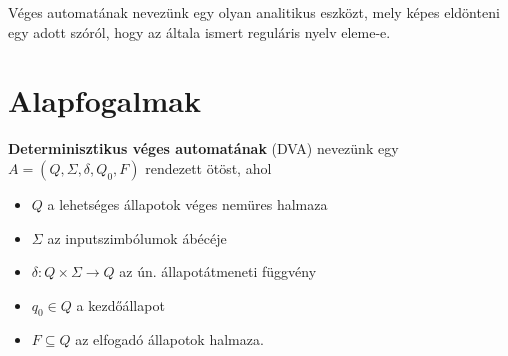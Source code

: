 Véges automatának nevezünk egy olyan analitikus eszközt, mely képes eldönteni egy adott szóról, hogy az általa ismert reguláris nyelv eleme-e.

\section{Alapfogalmak}
\begin{definition*}
	\textbf{Determinisztikus véges automatának} (DVA) nevezünk egy $ A = \left( Q, \Sigma, \delta, Q_0, F \right) $ rendezett ötöst, ahol
	\begin{itemize}
		\item $ Q $ a lehetséges állapotok véges nemüres halmaza
		\item $ \Sigma $ az inputszimbólumok ábécéje
		\item $ \delta: Q \times \Sigma \rightarrow Q $ az ún. állapotátmeneti függvény
		\item $ q_0 \in Q $ a kezdőállapot
		\item $ F \subseteq Q $ az elfogadó állapotok halmaza.
	\end{itemize}
\end{definition*}

